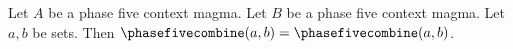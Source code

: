 

\begin{proposition}\label{phase5_structure_receiver_ambiguous}
    Let $A$ be a phase five context magma.
    Let $B$ be a phase five context magma.
    Let $a,b$ be sets.
    Then $\phasefivecombine(a,b)=\phasefivecombine(a,b)$.
\end{proposition}
